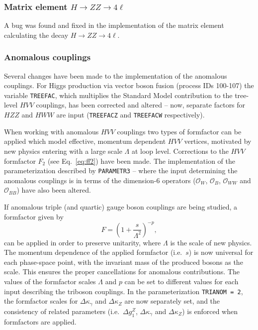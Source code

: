 \documentclass[english,12pt]{article}
\begin{document}
\subsubsection{Matrix element $H \rightarrow ZZ \rightarrow 4\ell$}
A bug was found and fixed in the implementation of the matrix element
calculating the decay $H \rightarrow ZZ \rightarrow 4\ell$.  

\subsubsection{Anomalous couplings}
Several changes have been made to the implementation of the anomalous couplings.  For Higgs production via vector boson fusion (process IDs 100-107) the variable {\tt TREEFAC}, which multiplies the Standard Model contribution to the tree-level $HVV$ couplings, has been corrected and altered -- now, separate factors for $HZZ$ and $HWW$ are input ({\tt TREEFACZ} and {\tt TREEFACW} respectively). 

When working with anomalous $HVV$ couplings two types of formfactor can be applied which model effective, momentum dependent $HVV$ vertices, motivated by new physics entering with a large scale $\Lambda$ at loop level.  Corrections to the $HVV$ formfactor $F_{2}$ (see Eq.~\ref{eq:ff2}) have been made.   The implementation of the parameterization described by {\tt PARAMETR3} -- where the input determining the anomalous couplings is in terms of the dimension-6 operators ($\mathcal{O}_{W}$, $\mathcal{O}_{B}$, $\mathcal{O}_{WW}$ and $\mathcal{O}_{BB}$) have also been altered. 

If anomalous triple (and quartic) gauge boson couplings are being studied, a formfactor given by
\begin{equation}
 F = \left(1 + \frac{s}{\Lambda^{2}} \right)^{-p},
\end{equation}
can be applied in order to preserve unitarity, where $\Lambda$ is the scale of new physics.  
The momentum dependence of the applied formfactor (i.e.\ $s$) is now universal for each phase-space point, with the invariant mass of the produced bosons as the scale.  This ensures the proper cancellations for anomalous contributions.  The values of the formfactor scales $\Lambda$ and $p$ can be set to different values for each input describing the triboson couplings.  In the parameterization {\tt TRIANOM = 2}, the formfactor scales for $\Delta \kappa_{\gamma}$ and $\Delta \kappa_{Z}$ are now separately set, and the consistency of related parameters  (i.e.\ $\Delta g_{1}^{Z}$, $\Delta \kappa_{\gamma}$ and $\Delta \kappa_{Z}$) is enforced when formfactors are applied.
\end{document}

